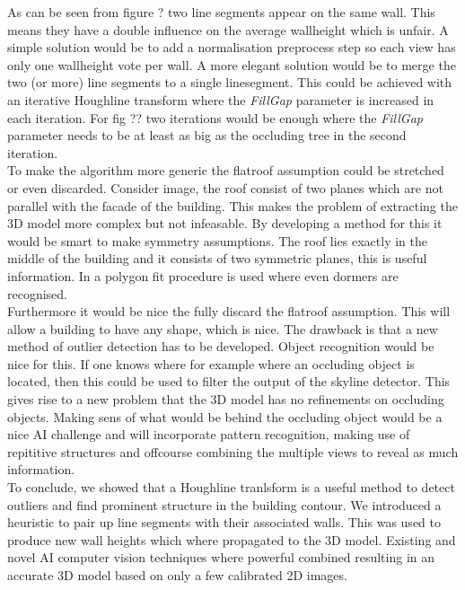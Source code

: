 \documentclass[10pt]{article}
\begin{document}
As can be seen from figure ?
two line segments appear on the same wall. This means they have a double influence on the average wallheight which is unfair. A simple solution would be to add a normalisation preprocess step so each view has only one wallheight vote per wall. A more elegant solution would be to merge the two (or more) line segments to a single linesegment. This could be achieved with an iterative Houghline transform where the \emph{FillGap} parameter is increased in each iteration. For fig ?? %
two iterations would be enough where the \emph{FillGap} parameter needs to be at least as big as the occluding tree in the second iteration.\\
To make the algorithm more generic the flatroof assumption could be stretched or even discarded.
Consider image, %
the roof consist of two planes which are not parallel with the facade of the building. This makes the problem of extracting the 3D model more complex but not 
infeasable. By developing a method for this it would be smart to make symmetry assumptions. The roof lies exactly in the middle of the building and it consists of two symmetric planes, this is useful information. In 
a polygon fit procedure is used where even dormers are recognised.\\

Furthermore it would be nice the fully discard the flatroof assumption. This will allow a building to have any shape, which is nice. The drawback is that a new method of outlier detection has to be developed. Object recognition would be nice for this. If one knows where for example where an occluding object is located, then this could be used to filter the output of the skyline detector. This gives rise to a new problem that the 3D model has no refinements on occluding objects.
Making sens of what would be behind the occluding object would be a nice AI challenge and will incorporate pattern recognition, making use of repititive structures and offcourse combining the multiple views to reveal as much information.\\







To conclude, we showed that a Houghline tranlsform is a useful method to detect outliers and find prominent structure in the building contour. We introduced a heuristic to pair up line segments with their associated walls. This was used to produce new wall heights which where propagated to the 3D model.
Existing and novel AI computer vision techniques where powerful combined resulting in an accurate 3D model based on only a few calibrated 2D images. 



\end{document}

